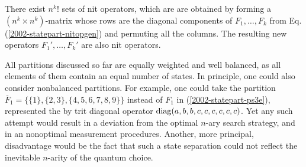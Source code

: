 There exist $n^k!$  sets of nit operators,
which are
are obtained by forming a $(n^k \times n^k)$-matrix
whose rows are the diagonal components of $F_1,\ldots,F_k$  from Eq.
(\ref{2002-statepart-nitopgen})
and permuting all the columns.
The resulting new operators $F_1',\ldots,F_k'$ are also nit operators.

All partitions discussed so far are equally weighted and well balanced,
as all elements of them contain an equal number of states.
In principle, one could also consider nonbalanced partitions.
For example, one could take the partition
$\overline{F}_1=\{\{1\},\{2,3\},\{4,5,6,7,8,9\}\}$
instead of $F_1$ in (\ref{2002-statepart-ps3e}),
represented the by trit diagonal operator
${\rm diag} (a,b,b,c,c,c,c,c,c)$.
Yet any such attempt would result
in a deviation from the optimal $n$-ary search strategy, and
in an nonoptimal measurement procedures.
Another, more principal, disadvantage would be the fact that such a state separation
could not reflect the inevitable $n$-arity of the quantum choice.




%

